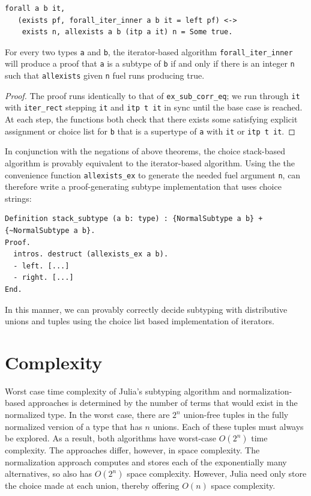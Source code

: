 \documentclass[a4paper,english]{lipics-v2019}
\begin{document}
\begin{lemma}
\begin{small}\begin{verbatim}
forall a b it,
   (exists pf, forall_iter_inner a b it = left pf) <->
    exists n, allexists a b (itp a it) n = Some true.
\end{verbatim}
\end{small}  
For every two types \verb|a| and \verb|b|, the iterator-based algorithm
\verb|forall_iter_inner| will produce a proof that \verb|a| is a subtype
of \verb|b| if and only if there is an integer \verb|n| such that
 \verb|allexists| given \verb|n| fuel runs producing true.
\end{lemma}
\begin{proof}
The proof runs identically to that of \verb|ex_sub_corr_eq|; we run through
\verb|it| with \verb|iter_rect| stepping \verb|it| and \verb|itp t it| in sync
until the base case is reached. At each step, the functions both check that there
exists some satisfying explicit assignment or choice list for \verb|b| that is a 
supertype of \verb|a| with \verb|it| or \verb|itp t it|. 
\end{proof}

In conjunction with the negations of above theorems, the choice stack-based algorithm is provably equivalent to the
iterator-based algorithm. Using the the convenience function \verb|allexists_ex| to generate the needed fuel argument \verb|n|,
can therefore write a proof-generating subtype implementation that uses choice strings:

\begin{verbatim}
Definition stack_subtype (a b: type) : {NormalSubtype a b} + {~NormalSubtype a b}.
Proof.
  intros. destruct (allexists_ex a b).
  - left. [...]
  - right. [...]
End.
\end{verbatim}

In this manner, we can provably correctly decide subtyping with distributive unions and tuples using
the choice list based implementation of iterators.

\section{Complexity}

Worst case time complexity of Julia's subtyping algorithm and
normalization-based approaches is determined by the number of terms that
would exist in the normalized type. In the worst case, there are $2^n$
union-free tuples in the fully normalized version of a type that has $n$
unions.  Each of these tuples must always be explored. As a result, both
algorithms have worst-case $O(2^n)$ time complexity. The approaches differ,
however, in space complexity. The normalization approach computes and stores
each of the exponentially many alternatives, so also has $O(2^n)$ space
complexity. However, Julia need only store the choice made at each union,
thereby offering $O(n)$ space complexity.
\end{document}
